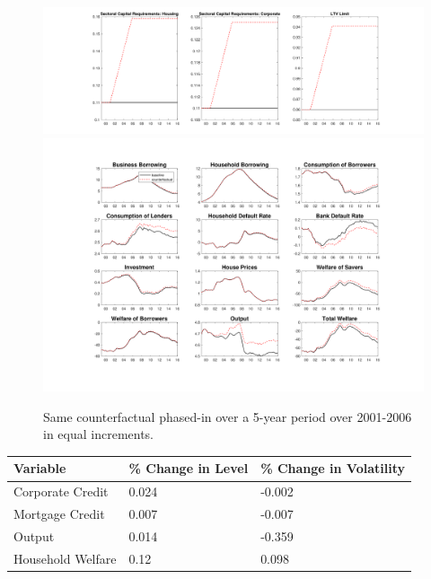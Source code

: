 \documentclass[12pt]{article}
\numberwithin{equation}{section}
\begin{document}
\begin{figure}[H]
\centering
\caption{Same counterfactual phased-in over a 5-year period over 2001-2006 in equal increments.}
\label{counterfact2_figure}
\includegraphics[scale=0.35]{CF_policy_rules10.pdf}
\includegraphics[scale=0.45]{counterfactuals10.pdf}\\

\end{figure}


\begin{table}[h]

\begin{tabular}{l|l|l}
\small
\label{counterfact2_table}
Variable & \% Change in Level & \% Change in Volatility \\
\hline
\hline
    Corporate Credit           &       0.024   &      -0.002 \\
    Mortgage Credit            &      0.007    &       -0.007 \\
    Output         				&     0.014    &    -0.359 \\ 
    Household Welfare       &     0.12     &     0.098\\
\end{tabular}
\end{table}
\end{document}
